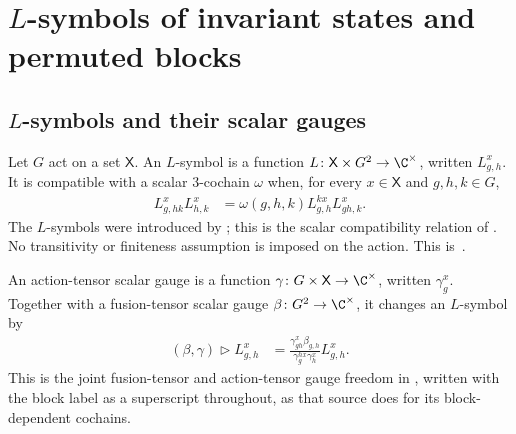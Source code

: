 \section{\texorpdfstring{$L$}{L}-symbols of invariant states and permuted blocks}

\subsection{\texorpdfstring{$L$}{L}-symbols and their scalar gauges}

\begin{definition}
    \label{def:mpug_l_symbols}
    \leanok
    Let $G$ act on a set $\mathsf X$. An $L$-symbol is a function
    $L\colon \mathsf X\times G^2\to\C^\times$, written $L^x_{g,h}$.
    It is compatible with a scalar $3$-cochain $\omega$ when, for every
    $x\in\mathsf X$ and $g,h,k\in G$,
    \begin{align}
        L^x_{g,hk}L^x_{h,k}
         & =\omega(g,h,k)L^{k x}_{g,h}L^x_{gh,k}.
        \label{eq:mpug_l_compatibility}
    \end{align}
    The $L$-symbols were introduced by
    \cite{GarreRubio2023MPOSym}; this is the scalar compatibility relation of
    \cite{FrancoRubio2025MPUGauging}. No transitivity or finiteness assumption
    is imposed on the action.
    This is~\cite[``L-symbols and compatibility'']{QICLean2026Blueprint}.
\end{definition}

\begin{definition}
    \label{def:mpug_l_gauge}
    \leanok
    An action-tensor scalar gauge is a function
    $\gamma\colon G\times\mathsf X\to\C^\times$, written $\gamma^x_g$.
    Together with a fusion-tensor scalar gauge $\beta\colon G^2\to\C^\times$,
    it changes an $L$-symbol by
    \begin{align}
        (\beta,\gamma)\mathbin{\triangleright}L^x_{g,h}
         & =\frac{\gamma^x_{gh}\beta_{g,h}}
        {\gamma^{h x}_g\gamma^x_h}L^x_{g,h}.
        \label{eq:mpug_l_gauge}
    \end{align}
    This is the joint fusion-tensor and action-tensor gauge freedom in
    \cite{FrancoRubio2025MPUGauging}, written with the block label as a
    superscript throughout, as that source does for its block-dependent
    cochains.
\end{definition}

